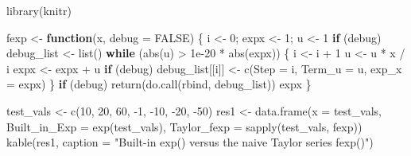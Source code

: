 \documentclass[
  letterpaper,
  DIV=11,
  numbers=noendperiod]{scrreprt}
\newenvironment{Shaded}{\begin{snugshade}}{\end{snugshade}}
\newcommand{\AttributeTok}[1]{\textcolor[rgb]{0.40,0.45,0.13}{#1}}
\newcommand{\ConstantTok}[1]{\textcolor[rgb]{0.56,0.35,0.01}{#1}}
\newcommand{\ControlFlowTok}[1]{\textcolor[rgb]{0.00,0.23,0.31}{\textbf{#1}}}
\newcommand{\DecValTok}[1]{\textcolor[rgb]{0.68,0.00,0.00}{#1}}
\newcommand{\FloatTok}[1]{\textcolor[rgb]{0.68,0.00,0.00}{#1}}
\newcommand{\FunctionTok}[1]{\textcolor[rgb]{0.28,0.35,0.67}{#1}}
\newcommand{\NormalTok}[1]{\textcolor[rgb]{0.00,0.23,0.31}{#1}}
\newcommand{\OtherTok}[1]{\textcolor[rgb]{0.00,0.23,0.31}{#1}}
\newcommand{\SpecialCharTok}[1]{\textcolor[rgb]{0.37,0.37,0.37}{#1}}
\newcommand{\StringTok}[1]{\textcolor[rgb]{0.13,0.47,0.30}{#1}}
\begin{document}
\begin{Shaded}
\begin{Highlighting}[]
\FunctionTok{library}\NormalTok{(knitr)}

\NormalTok{fexp }\OtherTok{\textless{}{-}} \ControlFlowTok{function}\NormalTok{(x, }\AttributeTok{debug =} \ConstantTok{FALSE}\NormalTok{) \{}
\NormalTok{  i }\OtherTok{\textless{}{-}} \DecValTok{0}\NormalTok{; expx }\OtherTok{\textless{}{-}} \DecValTok{1}\NormalTok{; u }\OtherTok{\textless{}{-}} \DecValTok{1}
  \ControlFlowTok{if}\NormalTok{ (debug) debug\_list }\OtherTok{\textless{}{-}} \FunctionTok{list}\NormalTok{()}
  \ControlFlowTok{while}\NormalTok{ (}\FunctionTok{abs}\NormalTok{(u) }\SpecialCharTok{\textgreater{}} \FloatTok{1e{-}20} \SpecialCharTok{*} \FunctionTok{abs}\NormalTok{(expx)) \{}
\NormalTok{    i }\OtherTok{\textless{}{-}}\NormalTok{ i }\SpecialCharTok{+} \DecValTok{1}
\NormalTok{    u }\OtherTok{\textless{}{-}}\NormalTok{ u }\SpecialCharTok{*}\NormalTok{ x }\SpecialCharTok{/}\NormalTok{ i}
\NormalTok{    expx }\OtherTok{\textless{}{-}}\NormalTok{ expx }\SpecialCharTok{+}\NormalTok{ u}
    \ControlFlowTok{if}\NormalTok{ (debug) debug\_list[[i]] }\OtherTok{\textless{}{-}} \FunctionTok{c}\NormalTok{(}\AttributeTok{Step =}\NormalTok{ i, }\AttributeTok{Term\_u =}\NormalTok{ u, }\AttributeTok{exp\_x =}\NormalTok{ expx)}
\NormalTok{  \}}
  \ControlFlowTok{if}\NormalTok{ (debug) }\FunctionTok{return}\NormalTok{(}\FunctionTok{do.call}\NormalTok{(rbind, debug\_list))}
\NormalTok{  expx}
\NormalTok{\}}

\NormalTok{test\_vals }\OtherTok{\textless{}{-}} \FunctionTok{c}\NormalTok{(}\DecValTok{10}\NormalTok{, }\DecValTok{20}\NormalTok{, }\DecValTok{60}\NormalTok{, }\SpecialCharTok{{-}}\DecValTok{1}\NormalTok{, }\SpecialCharTok{{-}}\DecValTok{10}\NormalTok{, }\SpecialCharTok{{-}}\DecValTok{20}\NormalTok{, }\SpecialCharTok{{-}}\DecValTok{50}\NormalTok{)}
\NormalTok{res1 }\OtherTok{\textless{}{-}} \FunctionTok{data.frame}\NormalTok{(}\AttributeTok{x =}\NormalTok{ test\_vals, }\AttributeTok{Built\_in\_Exp =} \FunctionTok{exp}\NormalTok{(test\_vals), }\AttributeTok{Taylor\_fexp =} \FunctionTok{sapply}\NormalTok{(test\_vals, fexp))}
\FunctionTok{kable}\NormalTok{(res1, }\AttributeTok{caption =} \StringTok{"Built{-}in exp() versus the naive Taylor series fexp()"}\NormalTok{)}
\end{Highlighting}
\end{Shaded}
\end{document}

